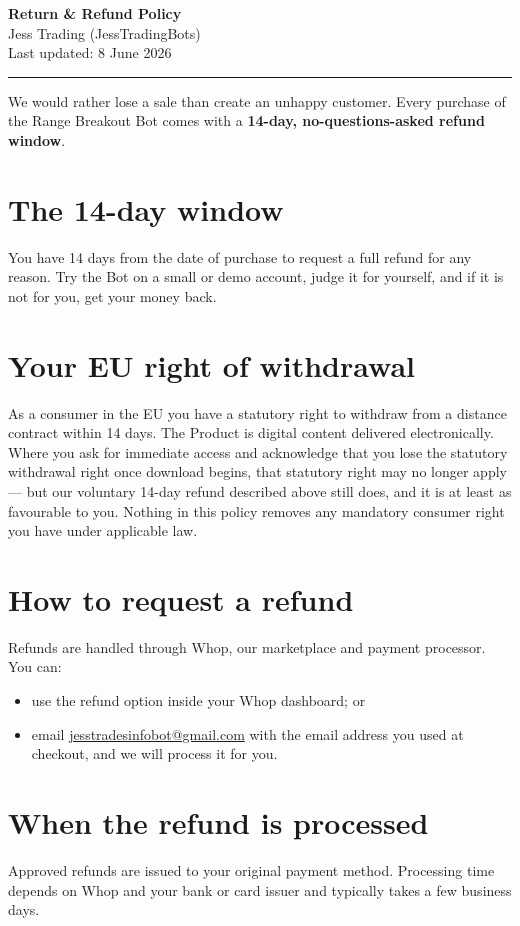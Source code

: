 \documentclass[11pt,a4paper]{article}
\begin{document}
\thispagestyle{fancy}

{\Huge\bfseries Return \& Refund Policy}\\[0.4em]
{\large Jess Trading (JessTradingBots)}\\[0.3em]
{\small Last updated: 8 June 2026}

\vspace{0.6em}
\hrule
\vspace{1em}

We would rather lose a sale than create an unhappy customer. Every purchase of the Range Breakout
Bot comes with a \textbf{14-day, no-questions-asked refund window}.

\section{The 14-day window}
You have 14 days from the date of purchase to request a full refund for any reason. Try the Bot on a
small or demo account, judge it for yourself, and if it is not for you, get your money back.

\section{Your EU right of withdrawal}
As a consumer in the EU you have a statutory right to withdraw from a distance contract within 14
days. The Product is digital content delivered electronically. Where you ask for immediate access
and acknowledge that you lose the statutory withdrawal right once download begins, that statutory
right may no longer apply --- but our voluntary 14-day refund described above still does, and it is
at least as favourable to you. Nothing in this policy removes any mandatory consumer right you have
under applicable law.

\section{How to request a refund}
Refunds are handled through Whop, our marketplace and payment processor. You can:
\begin{itemize}
  \item use the refund option inside your Whop dashboard; or
  \item email \href{mailto:jesstradesinfobot@gmail.com}{jesstradesinfobot@gmail.com} with the email
  address you used at checkout, and we will process it for you.
\end{itemize}

\section{When the refund is processed}
Approved refunds are issued to your original payment method. Processing time depends on Whop and
your bank or card issuer and typically takes a few business days.
\end{document}
